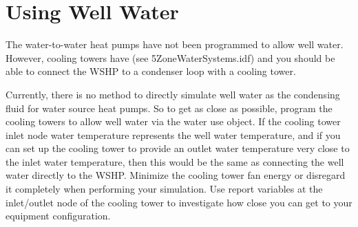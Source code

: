 \section{Using Well Water}\label{using-well-water}

The water-to-water heat pumps have not been programmed to allow well water. However, cooling towers have (see 5ZoneWaterSystems.idf) and you should be able to connect the WSHP to a condenser loop with a cooling tower.

Currently, there is no method to directly simulate well water as the condensing fluid for water source heat pumps. So to get as close as possible, program the cooling towers to allow well water via the water use object. If the cooling tower inlet node water temperature represents the well water temperature, and if you can set up the cooling tower to provide an outlet water temperature very close to the inlet water temperature, then this would be the same as connecting the well water directly to the WSHP. Minimize the cooling tower fan energy or disregard it completely when performing your simulation. Use report variables at the inlet/outlet node of the cooling tower to investigate how close you can get to your equipment configuration.
